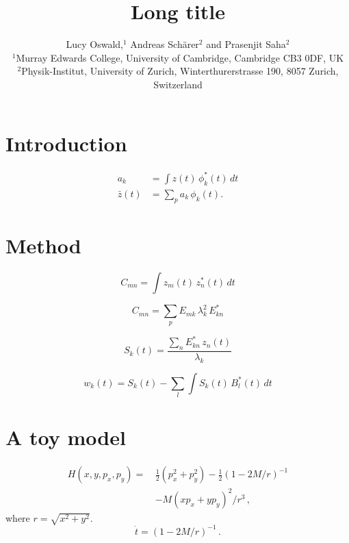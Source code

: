 \documentclass[usenatbib]{mnras}
\title[Short title]{Long title}
\author[Oswald et al]{Lucy Oswald,$^1$
Andreas Sch\"arer$^2$ and Prasenjit Saha$^2$\\
%
$^1$Murray Edwards College, University of Cambridge, Cambridge CB3 0DF, UK\\
$^2$Physik-Institut, University of Zurich, Winterthurerstrasse 190, 8057 Zurich, Switzerland\\
}
\begin{document}
\label{firstpage}
\pagerange{\pageref{firstpage}--\pageref{lastpage}}
\maketitle

\begin{abstract}
\end{abstract}

\begin{keywords}
\end{keywords}

\section{Introduction}

\begin{equation}
\begin{aligned}
        a_k &= \int\! z(t)\,\phi_k^*(t)\,dt \\
  \bar z(t) &= \sum_p a_k \, \phi_k(t) .
\end{aligned}
\end{equation}

\section{Method}

\citep{chatterjee2000introduction}

\begin{equation}
C_{mn} = \int\! z_m(t)\,z_n^*(t)\,dt
\end{equation}

\begin{equation}
C_{mn} = \sum_p E_{mk} \, \lambda_k^2 \, E_{kn}^*
\end{equation}

\begin{equation}
S_k(t) = \frac{\sum_n E_{kn}^*\,z_n(t)}{\lambda_k}
\end{equation}

\begin{equation}
w_k(t) = S_k(t) - \sum_l \int\! S_k(t)\,B_l^*(t)\,dt
\end{equation}

\section{A toy model}

\def\half{\mbox{$\frac12$}}
\begin{equation}
\begin{aligned}
H(x, y, p_x, p_y) =\,& \half \left( p_x^2 + p_y^2 \right)
                   - \half (1-2M/r)^{-1}                   \\
                  &- M (xp_x+yp_y)^2 / r^3\,,
\end{aligned}
\end{equation}
where $r=\sqrt{x^2+y^2}$.
\begin{equation} \label{dot-t}
     \dot t = (1 - 2M/r)^{-1} \,.
\end{equation}
\end{document}
